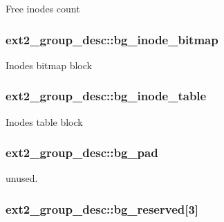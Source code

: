 Free inodes count \hypertarget{structext2__group__desc_a7ba3737304b14529a45aede6381aa968}{
\subsubsection[{bg\-\_\-inode\-\_\-bitmap}]{ ext2\-\_\-group\-\_\-desc\-::bg\-\_\-inode\-\_\-bitmap}}\label{structext2__group__desc_a7ba3737304b14529a45aede6381aa968}
Inodes bitmap block \hypertarget{structext2__group__desc_abf527c572a5fe30354cdf2cfc4f88b26}{
\subsubsection[{bg\-\_\-inode\-\_\-table}]{ ext2\-\_\-group\-\_\-desc\-::bg\-\_\-inode\-\_\-table}}\label{structext2__group__desc_abf527c572a5fe30354cdf2cfc4f88b26}
Inodes table block \hypertarget{structext2__group__desc_ac99983cee73aa4aace5c7d51b6d5a7e1}{
\subsubsection[{bg\-\_\-pad}]{ ext2\-\_\-group\-\_\-desc\-::bg\-\_\-pad}}\label{structext2__group__desc_ac99983cee73aa4aace5c7d51b6d5a7e1}
unused. \hypertarget{structext2__group__desc_aff7f7dc0b67aed284218b238991f5c93}{
\subsubsection[{bg\-\_\-reserved}]{ ext2\-\_\-group\-\_\-desc\-::bg\-\_\-reserved\mbox{[}3\mbox{]}}}\label{structext2__group__desc_aff7f7dc0b67aed284218b238991f5c93}
